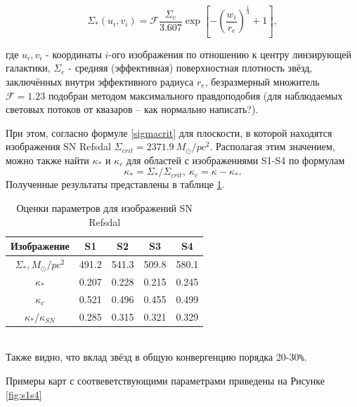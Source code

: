 \begin{equation}\label{vaucouleurs}
\Sigma_*\left(u_{i}, v_{i}\right)=\mathcal{F} \frac{\Sigma_{e}}{3.607} \exp \left[-\left(\frac{w_{i}}{r_{e}}\right)^{\frac{1}{4}}+1\right], 
\end{equation}

где $u_{i}, v_{i}$ - координаты $i$-ого изображения по отношению к центру линзирующей галактики, $\Sigma_e$ - средняя (эффективная) поверхностная плотность звёзд, заключённых внутри эффективного радиуса $r_e$, безразмерный множитель $\mathcal{F}=1.23$ подобран методом максимального правдоподобия (для наблюдаемых световых потоков от квазаров -- как нормально написать?). 

При этом, согласно формуле \eqref{sigmacrit} для плоскости, в которой находятся изображения SN Refsdal  $\Sigma_{crit} = 2371.9 \ M_{\odot}/pc^2 $. Располагая этим значением, можно также найти $\kappa_*$ и $\kappa_c$ для областей с изображениями S1-S4 по формулам $$\kappa_*=\Sigma_* /\Sigma_{crit}, \ \kappa_c = \kappa-\kappa_*. $$ Полученные результаты представлены в таблице \ref{tab:params}.

\begin{table}[h!]
  \caption{Оценки параметров для изображений SN Refsdal}
   \label{tab:params}
  \centering
    \begin{tabular}{ | c | c | c | c | c |}
    \hline
    Изображение & S1 & S2 & S3 & S4 \\ \hline
    $\Sigma_*, M_{\odot}/pc^2$ & 491.2 & 541.3 & 509.8 & 580.1\\ \hline
    $\kappa_*$ & 0.207 &  0.228 & 0.215 & 0.245 \\ \hline
    $\kappa_c$ & 0.521 & 0.496 & 0.455 & 0.499 \\ \hline
    $\kappa_*/\kappa_{SN}$ & 0.285 & 0.315 & 0.321 & 0.329 \\ \hline
    \end{tabular}
\end{table}
\\
Также видно, что вклад звёзд в общую конвергенцию порядка 20-30\verb|%|. 

Примеры карт с соотвеветствующими параметрами приведены на Рисунке \ref{fig:s1s4}

